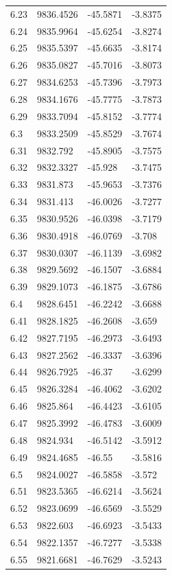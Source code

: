 \begin{table}[H]
\begin{tabular}{llll}
6.23 & 9836.4526 & -45.5871 & -3.8375 \\
6.24 & 9835.9964 & -45.6254 & -3.8274 \\
6.25 & 9835.5397 & -45.6635 & -3.8174 \\
6.26 & 9835.0827 & -45.7016 & -3.8073 \\
6.27 & 9834.6253 & -45.7396 & -3.7973 \\
6.28 & 9834.1676 & -45.7775 & -3.7873 \\
6.29 & 9833.7094 & -45.8152 & -3.7774 \\
6.3 & 9833.2509 & -45.8529 & -3.7674 \\
6.31 & 9832.792 & -45.8905 & -3.7575 \\
6.32 & 9832.3327 & -45.928 & -3.7475 \\
6.33 & 9831.873 & -45.9653 & -3.7376 \\
6.34 & 9831.413 & -46.0026 & -3.7277 \\
6.35 & 9830.9526 & -46.0398 & -3.7179 \\
6.36 & 9830.4918 & -46.0769 & -3.708 \\
6.37 & 9830.0307 & -46.1139 & -3.6982 \\
6.38 & 9829.5692 & -46.1507 & -3.6884 \\
6.39 & 9829.1073 & -46.1875 & -3.6786 \\
6.4 & 9828.6451 & -46.2242 & -3.6688 \\
6.41 & 9828.1825 & -46.2608 & -3.659 \\
6.42 & 9827.7195 & -46.2973 & -3.6493 \\
6.43 & 9827.2562 & -46.3337 & -3.6396 \\
6.44 & 9826.7925 & -46.37 & -3.6299 \\
6.45 & 9826.3284 & -46.4062 & -3.6202 \\
6.46 & 9825.864 & -46.4423 & -3.6105 \\
6.47 & 9825.3992 & -46.4783 & -3.6009 \\
6.48 & 9824.934 & -46.5142 & -3.5912 \\
6.49 & 9824.4685 & -46.55 & -3.5816 \\
6.5 & 9824.0027 & -46.5858 & -3.572 \\
6.51 & 9823.5365 & -46.6214 & -3.5624 \\
6.52 & 9823.0699 & -46.6569 & -3.5529 \\
6.53 & 9822.603 & -46.6923 & -3.5433 \\
6.54 & 9822.1357 & -46.7277 & -3.5338 \\
6.55 & 9821.6681 & -46.7629 & -3.5243 \\

\end{tabular}
\end{table}
